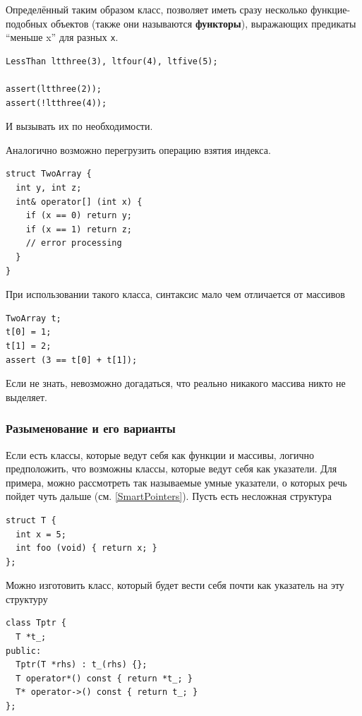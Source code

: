 \documentclass[a4paper,12pt,oneside]{article}
\begin{document}
Определённый таким образом класс, позволяет иметь сразу несколько функцие-подобных объектов (также они называются \textbf{функторы}), выражающих предикаты ``меньше x'' для разных \lstinline!x!.

\begin{lstlisting}
LessThan ltthree(3), ltfour(4), ltfive(5);

assert(ltthree(2));
assert(!ltthree(4));
\end{lstlisting}

И вызывать их по необходимости.

Аналогично возможно перегрузить операцию взятия индекса.

\begin{lstlisting}
struct TwoArray {
  int y, int z;
  int& operator[] (int x) {
    if (x == 0) return y;
    if (x == 1) return z;
    // error processing
  }
}
\end{lstlisting}

При использовании такого класса, синтаксис мало чем отличается от массивов

\begin{lstlisting}
TwoArray t;
t[0] = 1;
t[1] = 2;
assert (3 == t[0] + t[1]);
\end{lstlisting}

Если не знать, невозможно догадаться, что реально никакого массива никто не выделяет.

\subsubsection{Разыменование и его варианты}\label{DereferenceOverloading}

Если есть классы, которые ведут себя как функции и массивы, логично предположить, что возможны классы, которые ведут себя как указатели. Для примера, можно рассмотреть так называемые умные указатели, о которых речь пойдет чуть дальше (см. \ref{SmartPointers}). Пусть есть несложная структура

\begin{lstlisting}
struct T {
  int x = 5;
  int foo (void) { return x; }
};
\end{lstlisting}

Можно изготовить класс, который будет вести себя почти как указатель на эту структуру

\begin{lstlisting}
class Tptr {
  T *t_;
public:
  Tptr(T *rhs) : t_(rhs) {};
  T operator*() const { return *t_; }
  T* operator->() const { return t_; }
};
\end{lstlisting}
\end{document}
